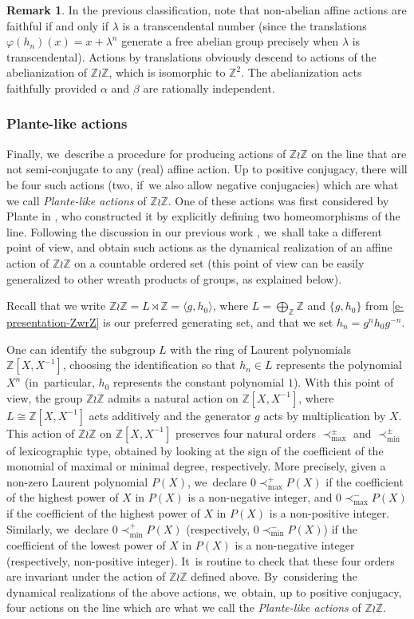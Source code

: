 \documentclass[10pt]{amsart}
\theoremstyle{definition}
\newtheorem{rem}[thm]{Remark}
\newcommand{\Z}{\mathbb Z}
\begin{document}
\begin{rem}
In the previous classification, note that non-abelian affine actions are faithful if and only if $\lambda$ is a transcendental number (since the translations $\varphi(h_n)(x)=x+\lambda^n$ generate a free abelian group precisely when $\lambda $ is transcendental). Actions by translations obviously descend to actions of the abelianization of $\Z \wr \Z$, which is isomorphic to $\Z^2$. The abelianization acts faithfully provided $\alpha$ and $\beta$ are rationally independent.
\end{rem}
\subsubsection{Plante-like actions}
\label{ssc.plante} Finally, we~describe a procedure for producing actions of $\Z\wr\Z$ on the line that are not semi-conjugate to any (real) affine action. Up to positive conjugacy, there will be four such actions (two, if~we also allow negative conjugacies) which are what we call \emph{Plante-like actions} of $\Z\wr\Z$. One of these actions was first considered by Plante in \cite{Plante}, who constructed it by explicitly defining two homeomorphisms of the line. Following the discussion in our previous work \cite[Ex.\,8.1.8]{BMRT}, we~shall take a different point of view, and obtain such actions as the dynamical realization of an affine action of $\Z\wr\Z$ on a countable ordered set (this point of view can be easily generalized to other wreath products of groups, as explained below).

Recall that we write $\Z \wr \Z=L\rtimes \Z=\langle g,h_0\rangle$, where $L=\bigoplus_\Z \Z$ and $\{ g, h_0\}$ from \eqref{e-presentation-ZwrZ} is our preferred generating set, and that we set $h_n=g^n h_0 g^{-n}$.

One can identify the subgroup $L$ with the ring of Laurent polynomials $\Z[X,X^{-1}]$, choosing the identification so that $h_n\in L$ represents the polynomial $ X^n$ (in~particular, $h_0$ represents the constant polynomial $1$). With this point of view, the group $\Z\wr\Z$ admits a natural action on $\Z[X,X^{-1}]$, where $L\cong \Z[X,X^{-1}]$ acts additively and the generator $g$ acts by multiplication by $X$. This action of $\Z \wr \Z$ on $\Z[X,X^{-1}]$ preserves four natural orders $\prec_{\max}^\pm$ and $\prec_{\min}^\pm$ of lexicographic type, obtained by looking at the sign of the coefficient of the monomial of maximal or minimal degree, respectively. More precisely, given a non-zero Laurent polynomial
$P(X)$, we~declare $0\prec_{\max}^+ P(X)$ if the coefficient of the highest power of $X$ in $P(X)$ is a non-negative integer, and $0\prec_{\max}^- P(X)$ if the coefficient of the highest power of $X$ in $P(X)$ is a non-positive integer. Similarly, we~declare $0\prec_{\min}^+ P(X)$ (respectively, $0\prec_{\min}^- P(X)$) if the coefficient of the lowest power of $X$ in $P(X)$ is a non-negative integer (respectively, non-positive integer). It~is routine to check that these four orders are invariant under the action of $\Z \wr \Z$ defined above. By~considering the dynamical realizations of the above actions, we~obtain, up to positive conjugacy, four actions on the line which are what we call the \emph{Plante-like actions} of $\Z \wr\Z$.
\end{document}
